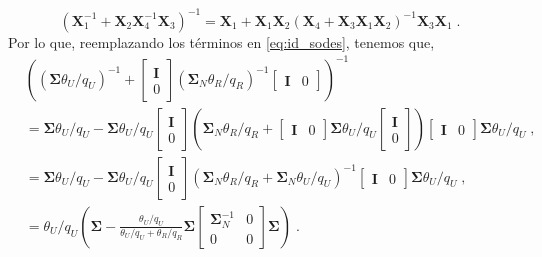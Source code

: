 \documentclass{article}
\begin{document}
\begin{equation}
	\left(\bm{X}^{-1}_1 + \bm{X}_2\bm{X}^{-1}_{4}\bm{X}_3\right)^{-1} = \bm{X}_1 + \bm{X}_1\bm{X}_2\left(\bm{X}_4 + \bm{X}_3\bm{X}_1\bm{X}_2\right)^{-1}\bm{X}_3\bm{X}_1\;.
	\label{eq:id_sodes}
\end{equation}
Por lo que, reemplazando los términos en \eqref{eq:id_sodes}, tenemos que,
\begin{equation*}
	\begin{split}
		& \left(\left(\bm{\Sigma}\theta_U/q_U\right)^{-1}+\begin{bmatrix}
			\bm{I}\\
			0
		\end{bmatrix}
		\left(\bm{\Sigma}_N \theta_R/q_R\right)^{-1}\begin{bmatrix}
			\bm{I} & 0
		\end{bmatrix}\right)^{-1}\\ 
		&= \bm{\Sigma}\theta_U/q_U -\bm{\Sigma}\theta_U/q_U\begin{bmatrix}
		\bm{I}\\
		0
		\end{bmatrix}
		\left(\bm{\Sigma}_N \theta_R/q_R + \begin{bmatrix}
			\bm{I} & 0
		\end{bmatrix}
		\bm{\Sigma}\theta_U/q_U\begin{bmatrix}
			\bm{I}\\
			0
		\end{bmatrix}
		\right)
		\begin{bmatrix}
			\bm{I} & 0
		\end{bmatrix}
		\bm{\Sigma}\theta_U/q_U\;,\\
		&= \bm{\Sigma}\theta_U/q_U - \bm{\Sigma}\theta_U/q_U\begin{bmatrix}
			\bm{I}\\
			0
		\end{bmatrix}
		\left(\bm{\Sigma}_N \theta_R/q_R + \bm{\Sigma}_N\theta_U/q_U\right)^{-1}\begin{bmatrix}
			\bm{I} & 0
		\end{bmatrix}
		\bm{\Sigma}\theta_U/q_U\;,\\
		&= \theta_U/q_U\left(\bm{\Sigma} - \frac{\theta_U/q_U}{\theta_U/q_U + \theta_R/q_R}\bm{\Sigma}\begin{bmatrix}
			\bm{\Sigma}^{-1}_{N} & 0\\
			0 & 0
		\end{bmatrix}
		\bm{\Sigma}
		\right)\;.
	\end{split}
\end{equation*}
\end{document}
